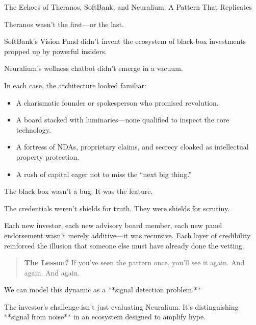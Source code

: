 \begin{HistoricalSidebar}{The Echoes of Theranos, SoftBank, and Neuralium: A Pattern That Replicates}

  Theranos wasn’t the first—or the last.  
  
  SoftBank’s Vision Fund didn’t invent the ecosystem of black-box investments propped up by powerful insiders.  
  
  Neuralium’s wellness chatbot didn’t emerge in a vacuum.

  \medskip
  
  In each case, the architecture looked familiar:
  
  \begin{itemize}
    \item A charismatic founder or spokesperson who promised revolution.
    \item A board stacked with luminaries—none qualified to inspect the core technology.
    \item A fortress of NDAs, proprietary claims, and secrecy cloaked as intellectual property protection.
    \item A rush of capital eager not to miss the “next big thing.”
  \end{itemize}

  \medskip
  
  The black box wasn’t a bug. It was the feature.

  The credentials weren’t shields for truth. They were shields for scrutiny.

  \medskip
  
  Each new investor, each new advisory board member, each new panel endorsement wasn’t merely additive—it was recursive. Each layer of credibility reinforced the illusion that someone else must have already done the vetting.

  \medskip

  \begin{quote}
  \textbf{The Lesson?} If you’ve seen the pattern once, you’ll see it again. And again. And again.
  \end{quote}

\end{HistoricalSidebar}

\medskip

We can model this dynamic as a **signal detection problem.**

The investor’s challenge isn’t just evaluating Neuralium.  
It’s distinguishing **signal from noise** in an ecosystem designed to amplify hype.

